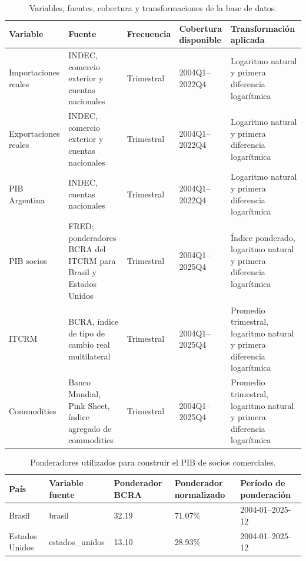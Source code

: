 \documentclass[11pt]{article}
\begin{document}
\begin{table}[H]
\centering
\caption{Variables, fuentes, cobertura y transformaciones de la base de datos.}
\label{tab:variables-fuentes-transformaciones}
\small
\begin{tabular}{p{3.1cm}p{4.1cm}p{2.0cm}p{2.4cm}p{4.3cm}}
\toprule
Variable & Fuente & Frecuencia & Cobertura disponible & Transformación aplicada \\
\midrule
Importaciones reales & INDEC, comercio exterior y cuentas nacionales & Trimestral & 2004Q1--2022Q4 & Logaritmo natural y primera diferencia logarítmica \\
Exportaciones reales & INDEC, comercio exterior y cuentas nacionales & Trimestral & 2004Q1--2022Q4 & Logaritmo natural y primera diferencia logarítmica \\
PIB Argentina & INDEC, cuentas nacionales & Trimestral & 2004Q1--2022Q4 & Logaritmo natural y primera diferencia logarítmica \\
PIB socios & FRED; ponderadores BCRA del ITCRM para Brasil y Estados Unidos & Trimestral & 2004Q1--2025Q4 & Índice ponderado, logaritmo natural y primera diferencia logarítmica \\
ITCRM & BCRA, índice de tipo de cambio real multilateral & Trimestral & 2004Q1--2025Q4 & Promedio trimestral, logaritmo natural y primera diferencia logarítmica \\
Commodities & Banco Mundial, Pink Sheet, índice agregado de commodities & Trimestral & 2004Q1--2025Q4 & Promedio trimestral, logaritmo natural y primera diferencia logarítmica \\
\bottomrule
\end{tabular}
\end{table}

\begin{table}[H]
\centering
\caption{Ponderadores utilizados para construir el PIB de socios comerciales.}
\label{tab:ponderadores-pib-socios}
\small
\begin{tabular}{p{3.0cm}p{3.0cm}p{3.0cm}p{3.0cm}p{3.8cm}}
\toprule
País & Variable fuente & Ponderador BCRA & Ponderador normalizado & Período de ponderación \\
\midrule
Brasil & brasil & 32.19 & 71.07\% & 2004-01--2025-12 \\
Estados Unidos & estados\_unidos & 13.10 & 28.93\% & 2004-01--2025-12 \\
\bottomrule
\end{tabular}
\end{table}
\end{document}
